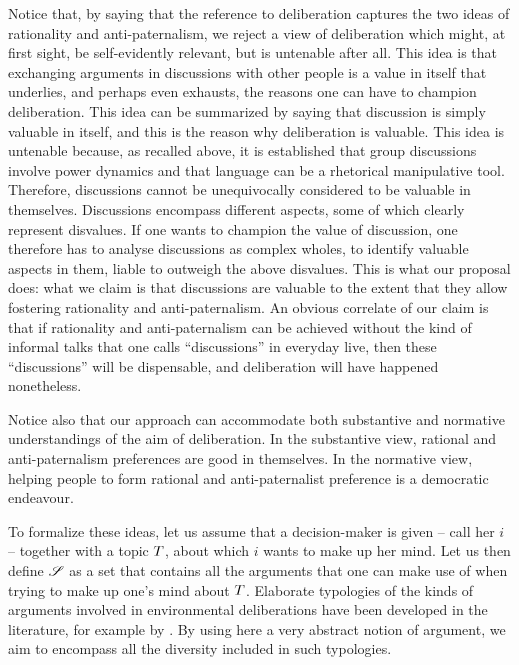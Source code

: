 \documentclass[version=3.21, pagesize, twoside=off, bibliography=totoc, DIV=calc, fontsize=12pt, a4paper, french, english]{scrartcl}
\begin{document}
Notice that, by saying that the reference to deliberation captures the two ideas of rationality and anti-paternalism, we reject a view of deliberation which might, at first sight, be self-evidently relevant, but is untenable after all. This idea is that exchanging arguments in discussions with other people is a value in itself that underlies, and perhaps even exhausts, the reasons one can have to champion deliberation. This idea can be summarized by saying that discussion is simply valuable in itself, and this is the reason why deliberation is valuable. This idea is untenable because, as recalled above, it is established that group discussions involve power dynamics and that language can be a rhetorical manipulative tool. Therefore, discussions cannot be unequivocally considered to be valuable in themselves. Discussions encompass different aspects, some of which clearly represent disvalues. If one wants to champion the value of discussion, one therefore has to analyse discussions as complex wholes, to identify valuable aspects in them, liable to outweigh the above disvalues. This is what our proposal does: what we claim is that discussions are valuable to the extent that they allow fostering rationality and anti-paternalism. An obvious correlate of our claim is that if rationality and anti-paternalism can be achieved without the kind of informal talks that one calls “discussions” in everyday live, then these “discussions” will be dispensable, and deliberation will have happened nonetheless.

Notice also that our approach can accommodate both substantive and normative understandings of the aim of deliberation. In the substantive view, rational and anti-paternalism  preferences are good in themselves. In the normative view, helping people to form rational and anti-paternalist  preference is a democratic endeavour.

To formalize these ideas, let us assume that a decision-maker is given -- call her $i$ -- together with a topic $T$, about which $i$ wants to make up her mind. 
Let us then define $\mathscr{S}$ as a set that contains all the arguments that one can make use of when trying to make up one’s mind about $T$.
Elaborate typologies of the kinds of arguments involved in environmental deliberations have been developed in the literature, for example by \citet{chateauraynaud_contrainte_2007}. 
By using here a very abstract notion of argument, we aim to encompass all the diversity included in such typologies. 
\end{document}
